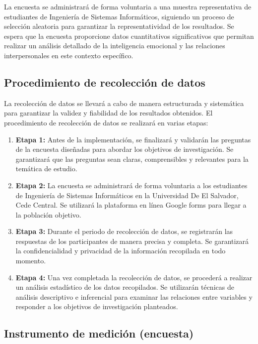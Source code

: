 \documentclass[journal]{IEEEtran}
\begin{document}
La encuesta se administrará de forma voluntaria a una muestra representativa de estudiantes de Ingeniería de Sistemas Informáticos, siguiendo un proceso de selección aleatoria para garantizar la representatividad de los resultados. Se espera que la encuesta proporcione datos cuantitativos significativos que permitan realizar un análisis detallado de la inteligencia emocional y las relaciones interpersonales en este contexto específico.

\subsection{Procedimiento de recolección de datos}
La recolección de datos se llevará a cabo de manera estructurada y sistemática para garantizar la validez y fiabilidad de los resultados obtenidos. El procedimiento de recolección de datos se realizará en varias etapas:

\begin{enumerate}
	\item \textbf{Etapa 1:} Antes de la implementación, se finalizará y validarán las preguntas de la encuesta diseñadas para abordar los objetivos de investigación. Se garantizará que las preguntas sean claras, comprensibles y relevantes para la temática de estudio.
	\item \textbf{Etapa 2:} La encuesta se administrará de forma voluntaria a los estudiantes de Ingeniería de Sistemas Informáticos en la Universidad De El Salvador, Cede Central. Se utilizará la plataforma en línea Google forms para llegar a la población objetivo.
	\item \textbf{Etapa 3:} Durante el periodo de recolección de datos, se registrarán las respuestas de los participantes de manera precisa y completa. Se garantizará la confidencialidad y privacidad de la información recopilada en todo momento.
	\item \textbf{Etapa 4:} Una vez completada la recolección de datos, se procederá a realizar un análisis estadístico de los datos recopilados. Se utilizarán técnicas de análisis descriptivo e inferencial para examinar las relaciones entre variables y responder a los objetivos de investigación planteados. 
\end{enumerate}

\newpage

\subsection{Instrumento de medición (encuesta)}
\end{document}
